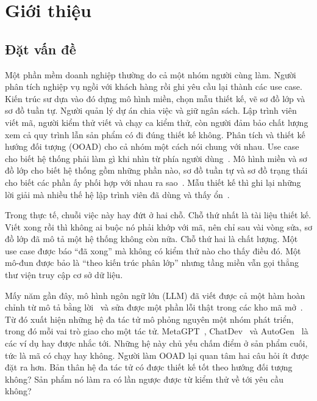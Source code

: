 \chapter{Giới thiệu}
\label{chap:gioi-thieu}

\section{Đặt vấn đề}

Một phần mềm doanh nghiệp thường do cả một nhóm người cùng làm. Người phân tích nghiệp vụ ngồi với khách hàng rồi ghi yêu cầu lại thành các use case. Kiến trúc sư dựa vào đó dựng mô hình miền, chọn mẫu thiết kế, vẽ sơ đồ lớp và sơ đồ tuần tự. Người quản lý dự án chia việc và giữ ngân sách. Lập trình viên viết mã, người kiểm thử viết và chạy ca kiểm thử, còn người đảm bảo chất lượng xem cả quy trình lẫn sản phẩm có đi đúng thiết kế không. Phân tích và thiết kế hướng đối tượng (OOAD) cho cả nhóm một cách nói chung với nhau. Use case cho biết hệ thống phải làm gì khi nhìn từ phía người dùng~\cite{jacobson1992}. Mô hình miền và sơ đồ lớp cho biết hệ thống gồm những phần nào, sơ đồ tuần tự và sơ đồ trạng thái cho biết các phần ấy phối hợp với nhau ra sao~\cite{booch2005,omg2017uml}. Mẫu thiết kế thì ghi lại những lời giải mà nhiều thế hệ lập trình viên đã dùng và thấy ổn~\cite{gamma1994,fowler2002}.

Trong thực tế, chuỗi việc này hay đứt ở hai chỗ. Chỗ thứ nhất là tài liệu thiết kế. Viết xong rồi thì không ai buộc nó phải khớp với mã, nên chỉ sau vài vòng sửa, sơ đồ lớp đã mô tả một hệ thống không còn nữa. Chỗ thứ hai là chất lượng. Một use case được báo ``đã xong'' mà không có kiểm thử nào cho thấy điều đó. Một mô-đun được bảo là ``theo kiến trúc phân lớp'' nhưng tầng miền vẫn gọi thẳng thư viện truy cập cơ sở dữ liệu.

Mấy năm gần đây, mô hình ngôn ngữ lớn (LLM) đã viết được cả một hàm hoàn chỉnh từ mô tả bằng lời~\cite{chen2021} và sửa được một phần lỗi thật trong các kho mã mở~\cite{jimenez2024}. Từ đó xuất hiện những hệ đa tác tử mô phỏng nguyên một nhóm phát triển, trong đó mỗi vai trò giao cho một tác tử. MetaGPT~\cite{hong2024}, ChatDev~\cite{qian2024} và AutoGen~\cite{wu2023} là các ví dụ hay được nhắc tới. Những hệ này chủ yếu chấm điểm ở sản phẩm cuối, tức là mã có chạy hay không. Người làm OOAD lại quan tâm hai câu hỏi ít được đặt ra hơn. Bản thân hệ đa tác tử có được thiết kế tốt theo hướng đối tượng không? Sản phẩm nó làm ra có lần ngược được từ kiểm thử về tới yêu cầu không?

